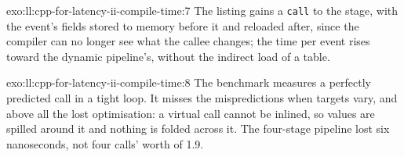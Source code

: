 \begin{solution}{exo:ll:cpp-for-latency-ii-compile-time:7}
The listing gains a \texttt{call} to the stage, with the event's fields stored to memory before it and reloaded after, since
the compiler can no longer see what the callee changes; the time per event rises toward the dynamic pipeline's, without the
indirect load of a table.
\end{solution}

\begin{solution}{exo:ll:cpp-for-latency-ii-compile-time:8}
The benchmark measures a perfectly predicted call in a tight loop. It misses the mispredictions when targets vary, and above
all the lost optimisation: a virtual call cannot be inlined, so values are spilled around it and nothing is folded across
it. The four-stage pipeline lost six nanoseconds, not four calls' worth of 1.9.
\end{solution}

